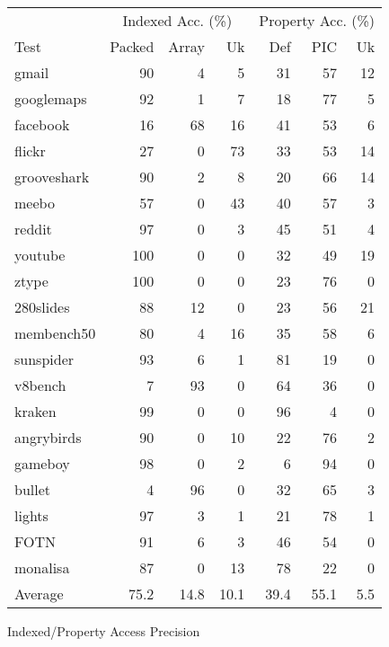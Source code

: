 \begin{figure}
\centering
\begin{tabular}{lrrrrrr}
\toprule
     & \multicolumn{3}{c}{Indexed Acc. (\%)}
     & \multicolumn{3}{c}{Property Acc. (\%)} \\
\cmidrule(r){2-4}
\cmidrule{5-7}
Test & Packed & Array & Uk
     & Def & PIC & Uk \\
\midrule
gmail          & 90 & 4 & 5 & 31 & 57 & 12 \\
googlemaps     & 92 & 1 & 7 & 18 & 77 & 5 \\
facebook       & 16 & 68 & 16 & 41 & 53 & 6 \\
flickr         & 27 & 0 & 73 & 33 & 53 & 14 \\
grooveshark    & 90 & 2 & 8 & 20 & 66 & 14 \\
meebo          & 57 & 0 & 43 & 40 & 57 & 3 \\
reddit         & 97 & 0 & 3 & 45 & 51 & 4 \\
youtube        & 100 & 0 & 0 & 32 & 49 & 19 \\
ztype          & 100 & 0 & 0 & 23 & 76 & 0 \\
280slides      & 88 & 12 & 0 & 23 & 56 & 21 \\
membench50     & 80 & 4 & 16 & 35 & 58 & 6 \\
\midrule
sunspider      & 93 & 6 & 1 & 81 & 19 & 0 \\
v8bench        & 7 & 93 & 0 & 64 & 36 & 0 \\
kraken         & 99 & 0 & 0 & 96 & 4 & 0 \\
\midrule
angrybirds     & 90 & 0 & 10 & 22 & 76 & 2 \\
gameboy        & 98 & 0 & 2 & 6 & 94 & 0 \\
bullet         & 4 & 96 & 0 & 32 & 65 & 3 \\
lights         & 97 & 3 & 1 & 21 & 78 & 1 \\
FOTN           & 91 & 6 & 3 & 46 & 54 & 0 \\
monalisa       & 87 & 0 & 13 & 78 & 22 & 0 \\
\midrule
Average        & 75.2 & 14.8 & 10.1 & 39.4 & 55.1 & 5.5 \\
\bottomrule
\end{tabular}
\nocaptionrule \caption{Indexed/Property Access Precision}
\label{fig:access_objects}
\end{figure}

